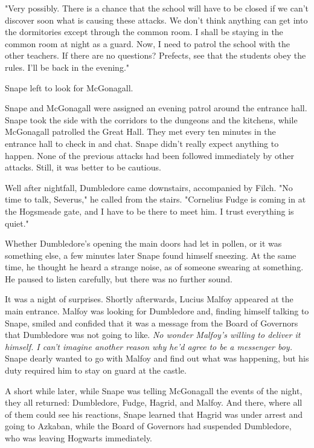 \documentclass[a4paper,11pt]{article}
\begin{document}
"Very possibly. There is a chance that the school will have to be closed if we can't discover soon what is causing these attacks. We don't think anything can get into the dormitories except through the common room. I shall be staying in the common room at night as a guard. Now, I need to patrol the school with the other teachers. If there are no questions? Prefects, see that the students obey the rules. I'll be back in the evening."

Snape left to look for McGonagall.

Snape and McGonagall were assigned an evening patrol around the entrance hall. Snape took the side with the corridors to the dungeons and the kitchens, while McGonagall patrolled the Great Hall. They met every ten minutes in the entrance hall to check in and chat. Snape didn't really expect anything to happen. None of the previous attacks had been followed immediately by other attacks. Still, it was better to be cautious.

Well after nightfall, Dumbledore came downstairs, accompanied by Filch. "No time to talk, Severus," he called from the stairs. "Cornelius Fudge is coming in at the Hogsmeade gate, and I have to be there to meet him. I trust everything is quiet."

Whether Dumbledore's opening the main doors had let in pollen, or it was something else, a few minutes later Snape found himself sneezing. At the same time, he thought he heard a strange noise, as of someone swearing at something. He paused to listen carefully, but there was no further sound.

It was a night of surprises. Shortly afterwards, Lucius Malfoy appeared at the main entrance. Malfoy was looking for Dumbledore and, finding himself talking to Snape, smiled and confided that it was a message from the Board of Governors that Dumbledore was not going to like. \emph{No wonder Malfoy's willing to deliver it himself. I can't imagine another reason why he'd agree to be a messenger boy.} Snape dearly wanted to go with Malfoy and find out what was happening, but his duty required him to stay on guard at the castle.

A short while later, while Snape was telling McGonagall the events of the night, they all returned: Dumbledore, Fudge, Hagrid, and Malfoy. And there, where all of them could see his reactions, Snape learned that Hagrid was under arrest and going to Azkaban, while the Board of Governors had suspended Dumbledore, who was leaving Hogwarts immediately.
\end{document}
